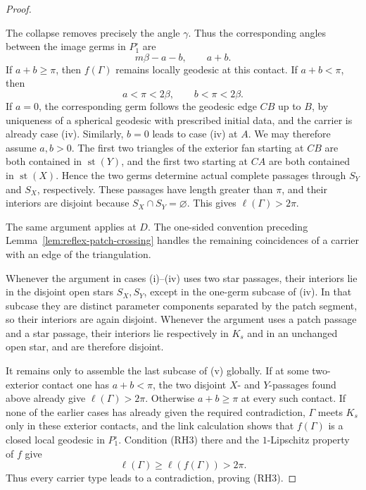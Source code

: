 \documentclass[12pt,a4paper]{article}
\theoremstyle{definition}
\begin{document}
\begin{proof}
\begin{enumerate}[label=\textup{(\roman*)},itemsep=0.35em,topsep=0.4em]
The collapse removes precisely the angle \(\gamma\).  Thus the corresponding
angles between the image germs in \(P_1^\circ\) are
\[
        m\beta-a-b,
        \qquad a+b.
\]
If \(a+b\ge\pi\), then \(f(\Gamma)\) remains locally geodesic at this contact.
If \(a+b<\pi\), then
\[
        a<\pi<2\beta,
        \qquad b<\pi<2\beta.
\]
If \(a=0\), the corresponding germ follows the geodesic edge \(CB\) up to
\(B\), by uniqueness of a spherical geodesic with prescribed initial data,
and the carrier is already case \textup{(iv)}.  Similarly, \(b=0\) leads to
case \textup{(iv)} at \(A\).  We may therefore assume \(a,b>0\).
The first two triangles of the exterior fan starting at \(CB\) are both
contained in \(\operatorname{st}(Y)\), and the first two starting at \(CA\)
are both contained in \(\operatorname{st}(X)\).  Hence the two germs determine
actual complete passages through \(S_Y\) and \(S_X\), respectively.  These
passages have length greater than \(\pi\), and their interiors are disjoint
because \(S_X\cap S_Y=\varnothing\).  This gives
\(\ell(\Gamma)>2\pi\).

The same argument applies at \(D\).  The one-sided convention preceding
Lemma~\ref{lem:reflex-patch-crossing} handles the remaining coincidences of a
carrier with an edge of the triangulation.
\end{enumerate}

Whenever the argument in cases \textup{(i)}--\textup{(iv)} uses two star
passages, their interiors lie in the disjoint open stars \(S_X,S_Y\), except
in the one-germ subcase of \textup{(iv)}.  In that subcase they are distinct
parameter components separated by the patch segment, so their interiors are
again disjoint.  Whenever the argument uses a patch passage and a star
passage, their interiors lie respectively in \(K_s\) and in an unchanged
open star, and are therefore disjoint.

It remains only to assemble the last subcase of \textup{(v)} globally.  If at
some two-exterior contact one has \(a+b<\pi\), the two disjoint \(X\)- and
\(Y\)-passages found above already give \(\ell(\Gamma)>2\pi\).  Otherwise
\(a+b\ge\pi\) at every such contact.  If none of the earlier cases has already
given the required contradiction, \(\Gamma\) meets \(K_s\) only in these
exterior contacts, and the link calculation shows that \(f(\Gamma)\) is a
closed local geodesic in \(P_1^\circ\).  Condition \textup{(RH3)} there and
the \(1\)-Lipschitz property of \(f\) give
\[
        \ell(\Gamma)\ge\ell(f(\Gamma))>2\pi.
\]
Thus every carrier type leads to a contradiction, proving \textup{(RH3)}.


\end{proof}
\end{document}
